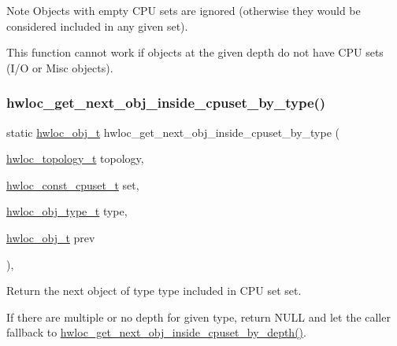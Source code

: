 \begin{DoxyNote}{Note}
Objects with empty C\+PU sets are ignored (otherwise they would be considered included in any given set).

This function cannot work if objects at the given depth do not have C\+PU sets (I/O or Misc objects). 
\end{DoxyNote}
\mbox{\label{a00195_gafe859176cf9233f215fea0e87cef47e7}} 
\subsubsection{\texorpdfstring{hwloc\+\_\+get\+\_\+next\+\_\+obj\+\_\+inside\+\_\+cpuset\+\_\+by\+\_\+type()}{hwloc\_get\_next\_obj\_inside\_cpuset\_by\_type()}}
{\footnotesize\ttfamily static \hyperlink{a00185_ga79b8ab56877ef99ac59b833203391c7d}{hwloc\+\_\+obj\+\_\+t} hwloc\+\_\+get\+\_\+next\+\_\+obj\+\_\+inside\+\_\+cpuset\+\_\+by\+\_\+type (\begin{DoxyParamCaption}\item[{\hyperlink{a00186_ga9d1e76ee15a7dee158b786c30b6a6e38}{hwloc\+\_\+topology\+\_\+t}}]{topology,  }\item[{\hyperlink{a00183_ga1f784433e9b606261f62d1134f6a3b25}{hwloc\+\_\+const\+\_\+cpuset\+\_\+t}}]{set,  }\item[{\hyperlink{a00184_gacd37bb612667dc437d66bfb175a8dc55}{hwloc\+\_\+obj\+\_\+type\+\_\+t}}]{type,  }\item[{\hyperlink{a00185_ga79b8ab56877ef99ac59b833203391c7d}{hwloc\+\_\+obj\+\_\+t}}]{prev }\end{DoxyParamCaption})\hspace{0.3cm}{\ttfamily [inline]}, {\ttfamily [static]}}



Return the next object of type {\ttfamily type} included in C\+PU set {\ttfamily set}. 

If there are multiple or no depth for given type, return {\ttfamily N\+U\+LL} and let the caller fallback to \hyperlink{a00195_ga63e3784e7c60fbae5073428cb98ac787}{hwloc\+\_\+get\+\_\+next\+\_\+obj\+\_\+inside\+\_\+cpuset\+\_\+by\+\_\+depth()}.

